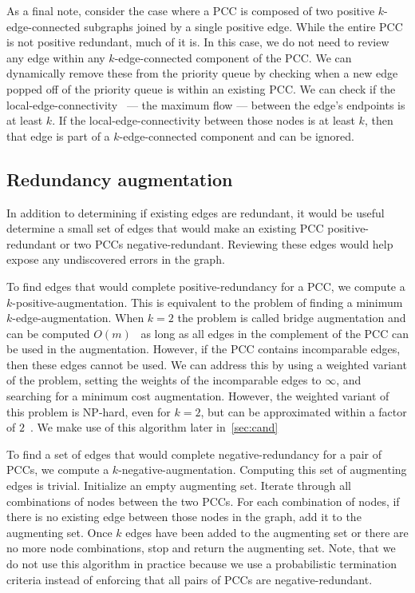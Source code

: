 As a final note, consider the case where a PCC is composed of two positive $k$-edge-connected subgraphs joined by
  a single positive edge.
While the entire PCC is not positive redundant, much of it is.
In this case, we do not need to review any edge within any $k$-edge-connected component of the PCC.
We can dynamically remove these from the priority queue by checking when a new edge popped off of the priority
  queue is within an existing PCC.
We can check if the local-edge-connectivity~\cite{esfahanian_connectivity_2017} --- \ie{} the maximum flow ---
  between the edge's endpoints is at least $k$.
If the local-edge-connectivity between those nodes is at least $k$, then that edge is part of a
  $k$-edge-connected component and can be ignored.


\subsection{Redundancy augmentation}\label{subsec:augredun}

In addition to determining if existing edges are redundant, it would be useful determine a small set of edges
  that would make an existing PCC positive-redundant or two PCCs negative-redundant.
Reviewing these edges would help expose any undiscovered errors in the graph.

To find edges that would complete positive-redundancy for a PCC, we compute a $k$-positive-augmentation.
This is equivalent to the problem of finding a minimum $k$-edge-augmentation.
When $k=2$ the problem is called bridge augmentation and can be computed $O(m)$~\cite{eswaran_augmentation_1976}
  as long as all edges in the complement of the PCC can be used in the augmentation.
However, if the PCC contains incomparable edges, then these edges cannot be used.
We can address this by using a weighted variant of the problem, setting the weights of the incomparable edges to
  $\infty$, and searching for a minimum cost augmentation.
However, the weighted variant of this problem is NP-hard, even for $k=2$, but can be approximated within a factor
  of $2$~\cite{khuller_approximation_1993}.
We make use of this algorithm later in~\cref{sec:cand}

To find a set of edges that would complete negative-redundancy for a pair of PCCs, we compute a
  $k$-negative-augmentation.
Computing this set of augmenting edges is trivial.
Initialize an empty augmenting set.
Iterate through all combinations of nodes between the two PCCs.
For each combination of nodes, if there is no existing edge between those nodes in the graph, add it to the
  augmenting set.
Once $k$ edges have been added to the augmenting set or there are no more node combinations, stop and return the
  augmenting set.
Note, that we do not use this algorithm in practice because we use a probabilistic termination criteria instead
  of enforcing that all pairs of PCCs are negative-redundant.

